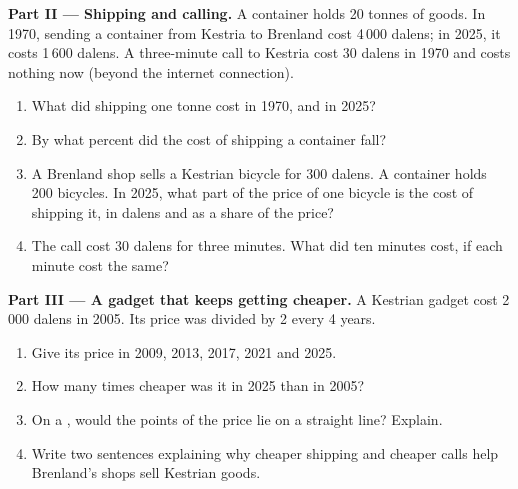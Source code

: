 \begin{problem}
\medskip
\noindent\textbf{Part II --- Shipping and calling.} A container holds 20 tonnes of
goods. In 1970, sending a container from Kestria to Brenland cost 4\,000 dalens; in
2025, it costs 1\,600 dalens. A three-minute call to Kestria cost 30 dalens in 1970
and costs nothing now (beyond the internet connection).
\begin{enumerate}[resume]
  \item What did shipping one tonne cost in 1970, and in 2025?
  \item By what percent did the cost of shipping a container fall?
  \item A Brenland shop sells a Kestrian bicycle for 300 dalens. A container holds
        200 bicycles. In 2025, what part of the price of one bicycle is the cost of
        shipping it, in dalens and as a share of the price?
  \item The call cost 30 dalens for three minutes. What did ten minutes cost, if
        each minute cost the same?
\end{enumerate}

\medskip
\noindent\textbf{Part III --- A gadget that keeps getting cheaper.} A Kestrian gadget
cost 2\,000 dalens in 2005. Its price was divided by 2 every 4 years.
\begin{enumerate}[resume]
  \item Give its price in 2009, 2013, 2017, 2021 and 2025.
  \item How many times cheaper was it in 2025 than in 2005?
  \item On a , would the points of the price lie on a straight line?
        Explain.
  \item Write two sentences explaining why cheaper shipping and cheaper calls help
        Brenland's shops sell Kestrian goods.
\end{enumerate}
\end{problem}
